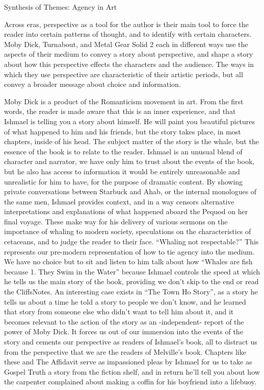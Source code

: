 \documentclass[
]{article}
\author{}
\date{}
\begin{document}
Synthesis of Themes: Agency in Art

Across eras, perspective as a tool for the author is their main tool to
force the reader into certain patterns of thought, and to identify with
certain characters. Moby Dick, Turnabout, and Metal Gear Solid 2 each in
different ways use the aspects of their medium to convey a story about
perspective, and shape a story about how this perspective effects the
characters and the audience. The ways in which they use perspective are
characteristic of their artistic periods, but all convey a broader
message about choice and information.

Moby Dick is a product of the Romanticism movement in art. From the
first words, the reader is made aware that this is an inner experience,
and that Ishmael is telling you a story about himself. He will paint you
beautiful pictures of what happened to him and his friends, but the
story takes place, in most chapters, inside of his head. The subject
matter of the story is the whale, but the essence of the book is to
relate to the reader. Ishmael is an unusual blend of character and
narrator, we have only him to trust about the events of the book, but he
also has access to information it would be entirely unreasonable and
unrealistic for him to have, for the purpose of dramatic content. By
showing private conversations between Starbuck and Ahab, or the internal
monologues of the same men, Ishmael provides context, and in a way
censors alternative interpretations and explanations of what happened
aboard the Pequod on her final voyage. These make way for his delivery
of various sermons on the importance of whaling to modern society,
speculations on the characteristics of cetaceans, and to judge the
reader to their face. ``Whaling not respectable?'' This represents our
pre-modern representation of how to tie agency into the medium. We have
no choice but to sit and listen to him talk about how ``Whales are fish
because 1. They Swim in the Water'' because Ishmael controls the speed
at which he tells us the main story of the book, providing we don't skip
to the end or read the CliffsNotes. An interesting case exists in ``The
Town Ho Story'', as a story he tells us about a time he told a story to
people we don't know, and he learned that story from someone else who
didn't want to tell him about it, and it becomes relevant to the action
of the story as an -independent- report of the power of Moby Dick. It
forces us out of our immersion into the events of the story and cements
our perspective as readers of Ishmael's book, all to distract us from
the perspective that we are the readers of Melville's book. Chapters
like these and The Affidavit serve as impassioned pleas by Ishmael for
us to take as Gospel Truth a story from the fiction shelf, and in return
he'll tell you about how the carpenter complained about making a coffin
for his boyfriend into a lifebuoy.
\end{document}
